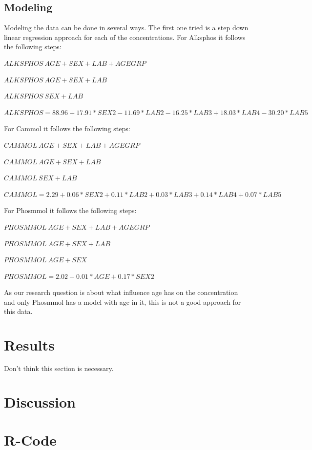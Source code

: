 \documentclass{article}
\begin{document}
    \subsection{Modeling}
      Modeling the data can be done in several ways.
      The first one tried is a step down linear regression approach for each of the concentrations.
      For Alksphos it follows the following steps:
      \begin{itemize}
        \tiny{\item $ALKSPHOS ~ AGE + SEX + LAB + AGEGRP$}
        \tiny{\item $ALKSPHOS ~ AGE + SEX + LAB$}
        \tiny{\item $ALKSPHOS ~ SEX + LAB$}
        \tiny{\item $ALKSPHOS = 88.96 + 17.91*SEX2 - 11.69*LAB2 - 16.25*LAB3 + 18.03*LAB4 - 30.20*LAB5$}
      \end{itemize}
      For Cammol it follows the following steps:
      \begin{itemize}
        \tiny{\item $CAMMOL ~ AGE + SEX + LAB + AGEGRP$}
        \tiny{\item $CAMMOL ~ AGE + SEX + LAB$}
        \tiny{\item $CAMMOL ~ SEX + LAB$}
        \tiny{\item $CAMMOL = 2.29 + 0.06*SEX2 + 0.11*LAB2 + 0.03*LAB3 + 0.14*LAB4 + 0.07*LAB5$}
      \end{itemize}
      For Phosmmol it follows the following steps:
      \begin{itemize}
        \tiny{\item $PHOSMMOL ~ AGE + SEX + LAB + AGEGRP$}
        \tiny{\item $PHOSMMOL ~ AGE + SEX + LAB$}
        \tiny{\item $PHOSMMOL ~ AGE + SEX$}
        \tiny{\item $PHOSMMOL = 2.02 - 0.01*AGE + 0.17*SEX2$}
      \end{itemize}
      As our research question is about what influence age has on the concentration and only Phosmmol has a model with age in it, this is not a good approach for this data.

  \section{Results}
    Don't think this section is necessary.

  \section{Discussion}
    
  \section{R-Code}
    \begin{lstlisting}[language=R]
    \end{lstlisting}
\end{document}
